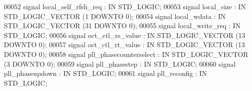 \begin{DoxyCode}
00052                  \textcolor{keywordflow}{signal} \textcolor{vhdlchar}{local_self_rfsh_req} \textcolor{vhdlchar}{:} \textcolor{keywordflow}{IN} \textcolor{comment}{STD\_LOGIC};
00053                  \textcolor{keywordflow}{signal} \textcolor{vhdlchar}{local_size} \textcolor{vhdlchar}{:} \textcolor{keywordflow}{IN} \textcolor{comment}{STD\_LOGIC\_VECTOR} \textcolor{vhdlchar}{(}\textcolor{vhdllogic}{}\textcolor{vhdllogic}{1} \textcolor{keywordflow}{DOWNTO} \textcolor{vhdllogic}{}\textcolor{vhdllogic}{0}\textcolor{vhdlchar}{)};
00054                  \textcolor{keywordflow}{signal} \textcolor{vhdlchar}{local_wdata} \textcolor{vhdlchar}{:} \textcolor{keywordflow}{IN} \textcolor{comment}{STD\_LOGIC\_VECTOR} \textcolor{vhdlchar}{(}\textcolor{vhdllogic}{}\textcolor{vhdllogic}{31} \textcolor{keywordflow}{DOWNTO} \textcolor{vhdllogic}{}\textcolor{vhdllogic}{0}\textcolor{vhdlchar}{)};
00055                  \textcolor{keywordflow}{signal} \textcolor{vhdlchar}{local_write_req} \textcolor{vhdlchar}{:} \textcolor{keywordflow}{IN} \textcolor{comment}{STD\_LOGIC};
00056                  \textcolor{keywordflow}{signal} \textcolor{vhdlchar}{oct_ctl_rs_value} \textcolor{vhdlchar}{:} \textcolor{keywordflow}{IN} \textcolor{comment}{STD\_LOGIC\_VECTOR} \textcolor{vhdlchar}{(}\textcolor{vhdllogic}{}\textcolor{vhdllogic}{13} \textcolor{keywordflow}{DOWNTO} \textcolor{vhdllogic}{}\textcolor{vhdllogic}{0}\textcolor{vhdlchar}{)};
00057                  \textcolor{keywordflow}{signal} \textcolor{vhdlchar}{oct_ctl_rt_value} \textcolor{vhdlchar}{:} \textcolor{keywordflow}{IN} \textcolor{comment}{STD\_LOGIC\_VECTOR} \textcolor{vhdlchar}{(}\textcolor{vhdllogic}{}\textcolor{vhdllogic}{13} \textcolor{keywordflow}{DOWNTO} \textcolor{vhdllogic}{}\textcolor{vhdllogic}{0}\textcolor{vhdlchar}{)};
00058                  \textcolor{keywordflow}{signal} \textcolor{vhdlchar}{pll_phasecounterselect} \textcolor{vhdlchar}{:} \textcolor{keywordflow}{IN} \textcolor{comment}{STD\_LOGIC\_VECTOR} \textcolor{vhdlchar}{(}\textcolor{vhdllogic}{}\textcolor{vhdllogic}{3} \textcolor{keywordflow}{DOWNTO} \textcolor{vhdllogic}{}\textcolor{vhdllogic}{0}\textcolor{vhdlchar}{)};
00059                  \textcolor{keywordflow}{signal} \textcolor{vhdlchar}{pll_phasestep} \textcolor{vhdlchar}{:} \textcolor{keywordflow}{IN} \textcolor{comment}{STD\_LOGIC};
00060                  \textcolor{keywordflow}{signal} \textcolor{vhdlchar}{pll_phaseupdown} \textcolor{vhdlchar}{:} \textcolor{keywordflow}{IN} \textcolor{comment}{STD\_LOGIC};
00061                  \textcolor{keywordflow}{signal} \textcolor{vhdlchar}{pll_reconfig} \textcolor{vhdlchar}{:} \textcolor{keywordflow}{IN} \textcolor{comment}{STD\_LOGIC};

\end{DoxyCode}
